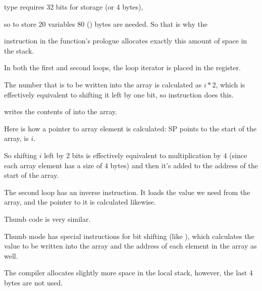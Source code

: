 
\subsubsectionold{\NonOptimizingKeilVI (\ARMMode)}



\Tint type requires 32 bits for storage (or 4 bytes),

so to store 20 \Tint variables 80 () bytes are needed.
So that is why the  

instruction in the function's prologue allocates exactly this amount of space in the stack.

In both the first and second loops, the loop iterator  is placed in the  register.


The number that is to be written into the array is calculated as $i*2$, which is effectively equivalent 
to shifting it left by one bit, so  instruction does this.

 writes the contents of  into the array.

Here is how a pointer to array element is calculated: \ac{SP} points to the start of the array,  is $i$.

So shifting $i$ left by 2 bits is effectively equivalent to multiplication by 4
(since each array element has a size of 4 bytes) and then it's added to the address of the start of the array.


The second loop has an inverse 
instruction. It loads the value we need from the array, and the pointer to it is calculated likewise.

\subsubsectionold{\OptimizingKeilVI (\ThumbMode)}



Thumb code is very similar.

Thumb mode has special instructions for bit shifting (like ),
which calculates the value to be written into the array and the address of each element in the array as well.

The compiler allocates slightly more space in the local stack, however, the last 4 bytes are not used.




